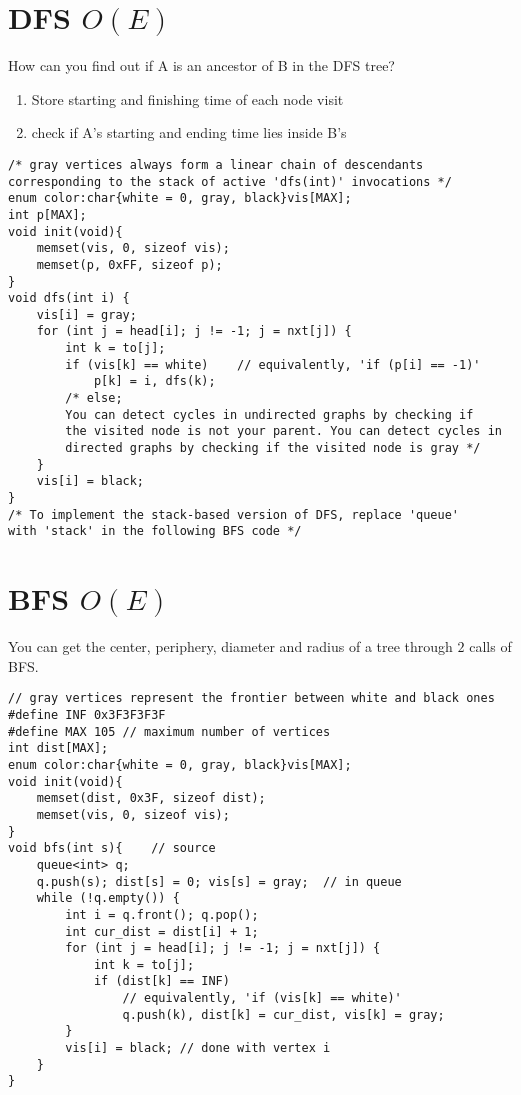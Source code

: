 \documentclass[12pt]{book}
\begin{document}
\section{DFS $O(E)$}
How can you find out if A is an ancestor of B in the DFS tree?
\begin{enumerate}[label = \roman*.]
\item Store starting and finishing time of each node visit
\item check if A's starting and ending time lies inside B's
\end{enumerate}
\begin{verbatim}
/* gray vertices always form a linear chain of descendants
corresponding to the stack of active 'dfs(int)' invocations */
enum color:char{white = 0, gray, black}vis[MAX];
int p[MAX];
void init(void){
	memset(vis, 0, sizeof vis);
	memset(p, 0xFF, sizeof p);
}
void dfs(int i) {
	vis[i] = gray;
	for (int j = head[i]; j != -1; j = nxt[j]) {
		int k = to[j];
		if (vis[k] == white)	// equivalently, 'if (p[i] == -1)'
			p[k] = i, dfs(k);
		/* else;
		You can detect cycles in undirected graphs by checking if
		the visited node is not your parent. You can detect cycles in
		directed graphs by checking if the visited node is gray */
	}
	vis[i] = black;
}
/* To implement the stack-based version of DFS, replace 'queue'
with 'stack' in the following BFS code */
\end{verbatim}
\section{BFS $O(E)$}
You can get the center, periphery, diameter and radius of a tree through $2$ calls of BFS.
\begin{verbatim}
// gray vertices represent the frontier between white and black ones
#define INF 0x3F3F3F3F
#define MAX 105	// maximum number of vertices
int dist[MAX];
enum color:char{white = 0, gray, black}vis[MAX];
void init(void){
	memset(dist, 0x3F, sizeof dist);
	memset(vis, 0, sizeof vis);
}
void bfs(int s){	// source
	queue<int> q;
	q.push(s); dist[s] = 0; vis[s] = gray;	// in queue
	while (!q.empty()) {
		int i = q.front(); q.pop();
		int cur_dist = dist[i] + 1;
		for (int j = head[i]; j != -1; j = nxt[j]) {
			int k = to[j];
			if (dist[k] == INF)
				// equivalently, 'if (vis[k] == white)'
				q.push(k), dist[k] = cur_dist, vis[k] = gray;
		}
		vis[i] = black;	// done with vertex i
	}
}
\end{verbatim}
\end{document}

